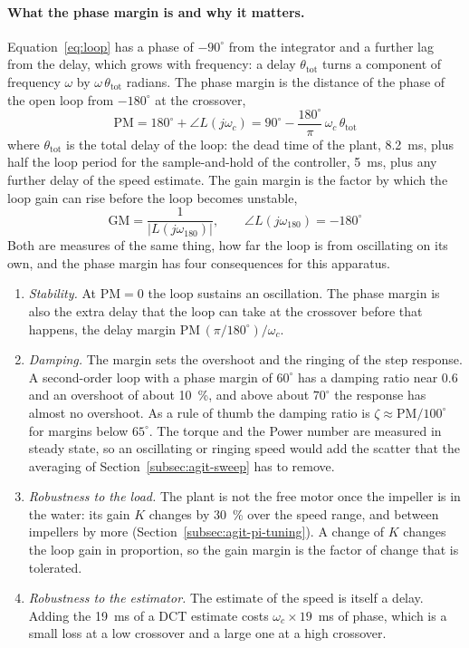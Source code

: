 \paragraph{What the phase margin is and why it matters.}
Equation~\ref{eq:loop} has a phase of $-90^{\circ}$ from the integrator and a further lag from the delay, which grows with frequency: a delay $\theta_{\mathrm{tot}}$ turns a component of frequency $\omega$ by $\omega\,\theta_{\mathrm{tot}}$ radians. The phase margin is the distance of the phase of the open loop from $-180^{\circ}$ at the crossover,
\begin{equation}
    \mathrm{PM} = 180^{\circ} + \angle L(j\omega_c) = 90^{\circ} - \frac{180^{\circ}}{\pi}\,\omega_c\,\theta_{\mathrm{tot}}
    \label{eq:pm}
\end{equation}
where $\theta_{\mathrm{tot}}$ is the total delay of the loop: the dead time of the plant, 8.2~ms, plus half the loop period for the sample-and-hold of the controller, 5~ms, plus any further delay of the speed estimate. The gain margin is the factor by which the loop gain can rise before the loop becomes unstable,
\begin{equation}
    \mathrm{GM} = \frac{1}{|L(j\omega_{180})|}, \qquad \angle L(j\omega_{180}) = -180^{\circ}
    \label{eq:gm}
\end{equation}
Both are measures of the same thing, how far the loop is from oscillating on its own, and the phase margin has four consequences for this apparatus.
\begin{enumerate}
    \item \emph{Stability.} At $\mathrm{PM} = 0$ the loop sustains an oscillation. The phase margin is also the extra delay that the loop can take at the crossover before that happens, the delay margin $\mathrm{PM}\,(\pi/180^{\circ})/\omega_c$.
    \item \emph{Damping.} The margin sets the overshoot and the ringing of the step response. A second-order loop with a phase margin of $60^{\circ}$ has a damping ratio near 0.6 and an overshoot of about 10~\%, and above about $70^{\circ}$ the response has almost no overshoot. As a rule of thumb the damping ratio is $\zeta \approx \mathrm{PM}/100^{\circ}$ for margins below $65^{\circ}$. The torque and the Power number are measured in steady state, so an oscillating or ringing speed would add the scatter that the averaging of Section~\ref{subsec:agit-sweep} has to remove.
    \item \emph{Robustness to the load.} The plant is not the free motor once the impeller is in the water: its gain $K$ changes by 30~\% over the speed range, and between impellers by more (Section~\ref{subsec:agit-pi-tuning}). A change of $K$ changes the loop gain in proportion, so the gain margin is the factor of change that is tolerated.
    \item \emph{Robustness to the estimator.} The estimate of the speed is itself a delay. Adding the 19~ms of a DCT estimate costs $\omega_c \times 19$~ms of phase, which is a small loss at a low crossover and a large one at a high crossover.
\end{enumerate}
